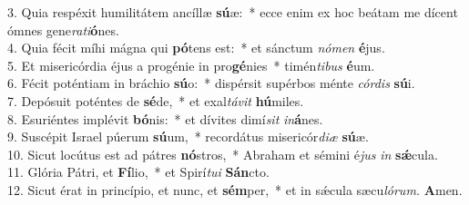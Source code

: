 3. Quia respéxit humilitátem ancíllæ \textbf{sú}æ: * ecce enim ex hoc beátam me dícent ómnes gene\textit{rati}\textbf{ó}nes.\\
4. Quia fécit míhi mágna qui \textbf{pó}tens est: * et sánctum \textit{nómen} \textbf{é}jus.\\
5. Et misericórdia éjus a progénie in pro\textbf{gé}nies * timén\textit{tibus} \textbf{é}um.\\
6. Fécit poténtiam in bráchio \textbf{sú}o: * dispérsit supérbos ménte \textit{córdis} \textbf{sú}i.\\
7. Depósuit poténtes de \textbf{sé}de, * et exal\textit{távit} \textbf{hú}miles.\\
8. Esuriéntes implévit \textbf{bó}nis: * et dívites dimí\textit{sit} \textit{in}\textbf{á}nes.\\
9. Suscépit Israel púerum \textbf{sú}um, * recordátus misericór\textit{diæ} \textbf{sú}æ.\\
10. Sicut locútus est ad pátres \textbf{nó}stros, * Abraham et sémini é\textit{jus} \textit{in} \textbf{sǽ}cula.\\
11. Glória Pátri, et \textbf{Fí}lio, * et Spirí\textit{tui} \textbf{Sán}cto.\\
12. Sicut érat in princípio, et nunc, et \textbf{sém}per, * et in sǽcula sæcu\textit{lórum.} \textbf{A}men.